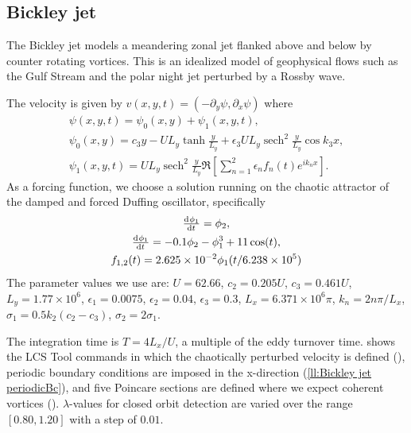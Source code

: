 \documentclass[5p]{elsarticle}
\DeclareMathOperator{\sech}{sech}
\begin{document}
\subsection{Bickley jet}

The Bickley jet models a meandering zonal jet flanked above and below by
counter rotating vortices. This is an idealized model of geophysical flows such as the Gulf Stream and the polar night jet perturbed by a Rossby wave\citep{castilloNegrete93:_chaot_rossb,beron-vera10:_invar_lagran}.

The velocity is given by $v(x,y,t) = (-\partial_y \psi, \partial_x \psi)$ where
\begin{gather*}
\psi(x,y,t) = \psi_0(x,y) + \psi_1(x,y,t),\\
\psi_0(x,y) = c_3 y - U L_y \tanh\frac{y}{L_y} + \epsilon_3 U L_y \sech^2\frac{y}{L_y} \cos k_3 x,\\
\psi_1(x,y,t) = U L_y \sech^2\frac{y}{L_y} \Re\left[\sum_{n=1}^2 \epsilon_n f_n(t) e^{i k_n x}\right].
\end{gather*}
As a forcing function, we choose a solution running on the chaotic attractor of the damped and forced Duffing oscillator, specifically
\begin{gather*}
\od{\phi_1}{t} = \phi_2,\\
\od{\phi_1}{t} = -0.1 \phi_2 - \phi_1^3 + 11 \cos(t),\\
f_{1,2}(t) = 2.625 \times 10^{-2} \phi_1(t/6.238 \times 10^5)
\end{gather*}
The parameter values we use are: $U = 62.66$, $c_2 = 0.205 U$, $c_3 = 0.461 U$, $L_y = 1.77 \times 10^6$, $\epsilon_1 = 0.0075$, $\epsilon_2 = 0.04$, $\epsilon_3 = 0.3$, $L_x = 6.371 \times 10^6 \pi$, $k_n = 2 n \pi/L_x$, $\sigma_1 = 0.5 k_2 (c_2 - c_3)$, $\sigma_2 = 2 \sigma_1$.

The integration time is $T = 4L_x/U$, a multiple of the eddy turnover time.  shows the LCS Tool commands in which the chaotically perturbed velocity is defined (), periodic boundary conditions are imposed in the x-direction (\cref{ll:Bickley jet periodicBc}), and five Poincare sections are defined where we expect coherent vortices ().
$\lambda$-values for closed orbit detection are varied over the range $[0.80,1.20]$ with a step of $0.01$.
\end{document}
